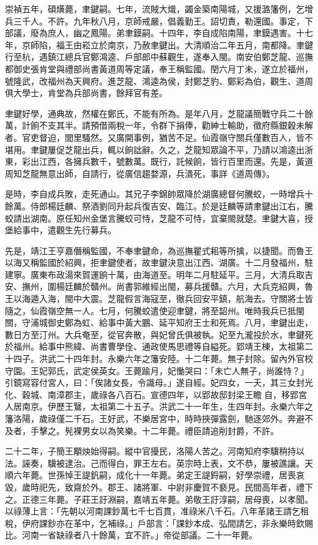 崇禎五年，碩熿薨，聿鍵嗣。七年，流賊大熾，蠲金築南陽城，又援潞籓例，乞增兵三千人。不許。九年秋八月，京師戒嚴，倡義勤王。詔切責，勒還國。事定，下部議，廢為庶人，幽之鳳陽。弟聿鏌嗣。十四年，李自成陷南陽，聿鏌遇害。十七年，京師陷，福王由崧立於南京，乃赦聿鍵出。大清順治二年五月，南都降。聿鍵行至杭，遇鎮江總兵官鄭鴻逵、戶部郎中蘇觀生，遂奉入閩。南安伯鄭芝龍、巡撫都御史張肯堂與禮部尚書黃道周等定議，奉王稱監國。閏六月丁未，遂立於福州，號隆武，改福州為天興府。進芝龍、鴻逵為侯，封鄭芝豹、鄭彩為伯，觀生、道周俱大學士，肯堂為兵部尚書，餘拜官有差。

聿鍵好學，通典故，然權在鄭氏，不能有所為。是年八月，芝龍議簡戰守兵二十餘萬，計餉不支其半。請預借兩稅一年，令群下捐俸，勸紳士輸助，徵府縣銀穀未解者。官吏督迫，閭里騷然。又廣開事例，猶苦不足。仙霞嶺守關兵僅數百人，皆不堪用。聿鍵屢促芝龍出兵，輒以餉詘辭。久之，芝龍知眾論不平，乃請以鴻逵出浙東，彩出江西，各擁兵數千，號數萬。既行，託候餉，皆行百里而還。先是，黃道周知芝龍無意出師，自請行，從廣信趨婺源，兵潰死，事詳《道周傳》。

是時，李自成兵敗，走死通山。其兄子李錦帥眾降於湖廣總督何騰蛟，一時增兵十餘萬。侍郎楊廷麟、祭酒劉同升起兵復吉安、臨江。於是廷麟等請聿鍵出江右，騰蛟請出湖南。原任知州金堡言騰蛟可恃，芝龍不可恃，宜棄閩就楚。聿鍵大喜，授堡給事中，遣觀生先行募兵。

先是，靖江王亨嘉僭稱監國，不奉聿鍵命，為巡撫瞿式耜等所擒，以捷聞。而魯王以海又稱監國於紹興，拒聿鍵使者，故聿鍵決意出江西、湖廣。十二月發福州，駐建寧。廣東布政湯來賀運餉十萬，由海道至。明年二月駐延平。三月，大清兵取吉安、撫州，圍楊廷麟於贛州。尚書郭維經出閩，募兵援贛。六月，大兵克紹興，魯王以海遁入海，閩中大震。芝龍假言海寇至，徹兵回安平鎮，航海去。守關將士皆隨之，仙霞嶺空無一人。七月，何騰蛟遣使迎聿鍵，將至韶州。唯時我兵已抵閩關，守浦城御史鄭為虹、給事中黃大鵬、延平知府王士和死焉。八月，聿鍵出走，數日方至汀州。大兵奄至，從官奔散，與妃曾氏俱被執。妃至九瀧投於水，聿鍵死於福州。給事中熊緯、尚書曹學佺、通政使馬思禮等自縊死。郢靖王棟，太祖第二十四子。洪武二十四年封。永樂六年之籓安陸。十二年薨。無子封除。留內外官校守園。王妃郭氏，武定侯英女。王薨踰月，妃慟哭曰：「未亡人無子，尚誰恃？」引鏡寫容付宮人，曰：「俟諸女長，令識母。」遂自經。妃四女，一夭，其三女封光化、穀城、南漳郡主，歲祿各八百石。宣德四年，以郢故邸封梁王瞻自，移郢宮人居南京。伊歷王鷖，太祖第二十五子。洪武二十一年生，生四年封。永樂六年之籓洛陽，歲祿僅二千石。王好武，不樂居宮中，時時挾彈露劍，馳逐郊外。奔避不及者，手擊之。髡裸男女以為笑樂。十二年薨。禮臣請追削封爵，不許。

二十二年，子簡王顒炴始得嗣。縱中官擾民，洛陽人苦之。河南知府李驥稍持以法。誣奏，驥被逮治。己而得白，罪王左右。英宗時上表，文不恭，屢被譙讓。天順六年薨。世孫悼王諟釩嗣，成化十一年薨。弟定王諟鋝嗣，好學崇禮，居喪哀毀，歲時祀先，致齋於外。郡王、諸將軍、中尉非慶賀不褻見。民間高年者，禮下之。正德三年薨。子莊王訏淵嗣，嘉靖五年薨。弟敬王訏淳嗣，居母喪，以孝聞。以祿薄上言：「先朝以河南課鈔萬七千七百貫，准祿米八千石。八年革諸王請乞租稅，伊府課鈔亦在革中，乞補祿。」戶部言：「課鈔本成、弘間請乞，非永樂時欽賜比。河南一省缺祿者八十餘萬，宜不許。」帝從部議。二十一年薨。

